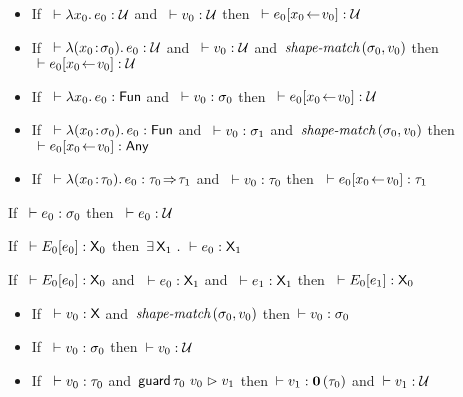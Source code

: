 \documentclass[nonacm,10pt]{acmart}
\begin{document}
\begin{lemma}\leavevmode
  \begin{itemize}
    \item
      If\ $~\vdash \lambda x_0.\, e_0 : \mathcal{U}$
      and\ $~\vdash v_0 : \mathcal{U}$
      then\ $~\vdash e_0[x_0\!\leftarrow\!v_0] : \mathcal{U}$
    \item
      If\ $~\vdash \lambda (x_0\!:\!\sigma_0).\, e_0 : \mathcal{U}$
      and\ $~\vdash v_0 : \mathcal{U}$
      and\ $\textit{shape-match}\,(\sigma_0, v_0)$
      then\ $~\vdash e_0[x_0\!\leftarrow\!v_0] : \mathcal{U}$
    \item
      If\ $~\vdash \lambda x_0.\, e_0 : \mathsf{Fun}$
      and\ $~\vdash v_0 : \sigma_0$
      then\ $~\vdash e_0[x_0\!\leftarrow\!v_0] : \mathcal{U}$
    \item
      If\ $~\vdash \lambda (x_0\!:\!\sigma_0).\, e_0 : \mathsf{Fun}$
      and\ $~\vdash v_0 : \sigma_1$
      and\ $\textit{shape-match}\,(\sigma_0, v_0)$
      then\ $~\vdash e_0[x_0\!\leftarrow\!v_0] : \mathsf{Any}$
    \item
      If\ $~\vdash \lambda (x_0\!:\!\tau_0).\, e_0 : \tau_0\!\Rightarrow\!\tau_1$
      and\ $~\vdash v_0 : \tau_0$
      then\ $~\vdash e_0[x_0\!\leftarrow\!v_0] : \tau_1$
  \end{itemize}
\end{lemma}

\begin{lemma}[S to U]
  If\ $~\vdash e_0 : \sigma_0$
  then\ $~\vdash e_0 : \mathcal{U}$
\end{lemma}

\begin{lemma}
  If\ $~\vdash E_0[e_0] : \mathsf{X}_0$
  then\ $\exists\,\mathsf{X}_1~.~ \vdash e_0 : \mathsf{X}_1$
\end{lemma}

\begin{lemma}
  If\ $~\vdash E_0[e_0] : \mathsf{X}_0$
  and\ $~\vdash e_0 : \mathsf{X}_1$
  and\ $~\vdash e_1 : \mathsf{X}_1$
  then\ $~\vdash E_0[e_1] : \mathsf{X}_0$
\end{lemma}

\begin{lemma}[boundary]\leavevmode
  \begin{itemize}
    \item
      If\ $~\vdash v_0 : \mathsf{X}$
      and\ $\textit{shape-match}\,(\sigma_0, v_0)$
      then\ $\vdash v_0 : \sigma_0$
    \item
      If\ $~\vdash v_0 : \sigma_0$
      then\ $\vdash v_0 : \mathcal{U}$
    \item
      If\ $~\vdash v_0 : \tau_0$
      and\ $\mathsf{guard}\,\tau_0~v_0 \vartriangleright v_1$
      then\ $\vdash v_1 : \mathbf{0}\,(\tau_0)$
      and\ $\vdash v_1 : \mathcal{U}$
  \end{itemize}
\end{lemma}
\end{document}
